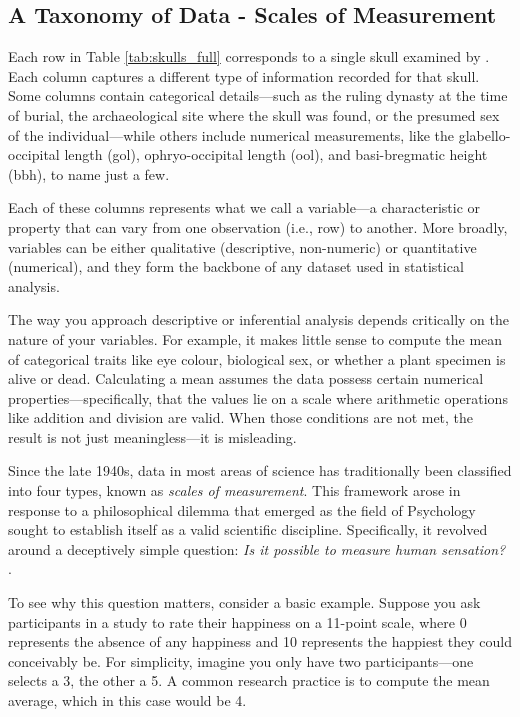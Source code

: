 \subsection{A Taxonomy of Data - Scales of Measurement}

Each row in Table \ref{tab:skulls_full} corresponds to a single skull examined by \textcite{Thomson1905}. Each column captures a different type of information recorded for that skull. Some columns contain categorical details—such as the ruling dynasty at the time of burial, the archaeological site where the skull was found, or the presumed sex of the individual—while others include numerical measurements, like the glabello-occipital length (gol), ophryo-occipital length (ool), and basi-bregmatic height (bbh), to name just a few.

Each of these columns represents what we call a variable—a characteristic or property that can vary from one observation (i.e., row) to another. More broadly, variables can be either qualitative (descriptive, non-numeric) or quantitative (numerical), and they form the backbone of any dataset used in statistical analysis.

The way you approach descriptive or inferential analysis depends critically on the nature of your variables. For example, it makes little sense to compute the mean of categorical traits like eye colour, biological sex, or whether a plant specimen is alive or dead. Calculating a mean assumes the data possess certain numerical properties—specifically, that the values lie on a scale where arithmetic operations like addition and division are valid. When those conditions are not met, the result is not just meaningless—it is misleading.

Since the late 1940s, data in most areas of science has traditionally been classified into four types, known as \textit{scales of measurement}. This framework arose in response to a philosophical dilemma that emerged as the field of Psychology sought to establish itself as a valid scientific discipline. Specifically, it revolved around a deceptively simple question: \textit{Is it possible to measure human sensation?} \parencite[p. 677]{Stevens1946}.

To see why this question matters, consider a basic example. Suppose you ask participants in a study to rate their happiness on a 11-point scale, where 0 represents the absence of any happiness and 10 represents the happiest they could
conceivably be. For simplicity, imagine you only have two participants—one selects a 3, the other a 5. A common research practice is to compute the mean average, which in this case would be 4. 

